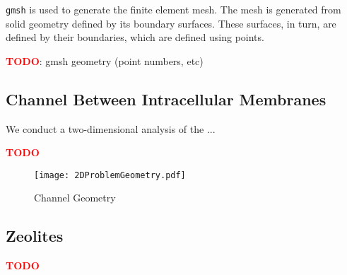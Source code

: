 \texttt{gmsh} is used to generate the finite element mesh.
The mesh is generated from solid geometry defined by its boundary surfaces.
These surfaces, in turn, are defined by their boundaries,
which are defined using points.

\textcolor{red}{\textbf{TODO}}: gmsh geometry (point numbers, etc)

\subsection{Channel Between Intracellular Membranes}\label{subsec:intracellular_membranes}

We conduct a two-dimensional analysis of the ...

\textcolor{red}{\textbf{TODO}}

\begin{figure}[H]
\centering
\texttt{[image: 2DProblemGeometry.pdf]}
\caption{Channel Geometry}
\label{fig:channel_geometry}
\end{figure}

\subsection{Zeolites}\label{subsec:zeolites}

\textcolor{red}{\textbf{TODO}}
